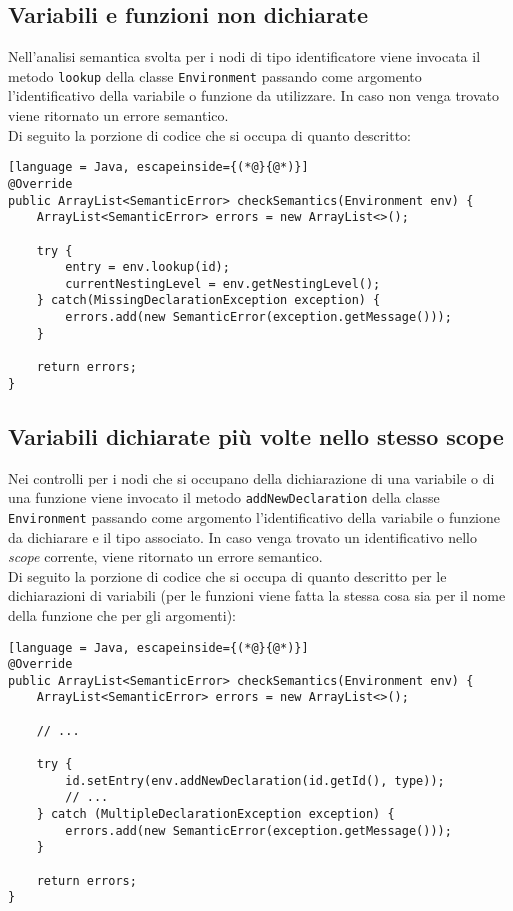 \documentclass[../report.tex]{subfiles}
\begin{document}
\subsection{Variabili e funzioni non dichiarate}\label{s:variabili-funzioni-non-dichiarate}
Nell'analisi semantica svolta per i nodi di tipo identificatore viene invocata il metodo \verb|lookup| della classe \verb|Environment| passando come argomento l'identificativo della variabile o funzione da utilizzare.
In caso non venga trovato viene ritornato un errore semantico.\\
\noindent
Di seguito la porzione di codice che si occupa di quanto descritto:
\begin{lstlisting}[language = Java, escapeinside={(*@}{@*)}]
@Override
public ArrayList<SemanticError> checkSemantics(Environment env) {
    ArrayList<SemanticError> errors = new ArrayList<>();

    try {
        entry = env.lookup(id);
        currentNestingLevel = env.getNestingLevel();
    } catch(MissingDeclarationException exception) {
        errors.add(new SemanticError(exception.getMessage()));
    }

    return errors;
}
\end{lstlisting}

\subsection{Variabili dichiarate più volte nello stesso scope}\label{s:variabili-dichiarate-piu-volte-stesso-scope}
Nei controlli per i nodi che si occupano della dichiarazione di una variabile o di una funzione viene invocato il metodo \verb|addNewDeclaration| della classe \verb|Environment| passando come argomento l'identificativo della variabile o funzione da dichiarare e il tipo associato.
In caso venga trovato un identificativo nello \textit{scope} corrente, viene ritornato un errore semantico.\\
\noindent
Di seguito la porzione di codice che si occupa di quanto descritto per le dichiarazioni di variabili (per le funzioni viene fatta la stessa cosa sia per il nome della funzione che per gli argomenti):
\begin{lstlisting}[language = Java, escapeinside={(*@}{@*)}]
@Override
public ArrayList<SemanticError> checkSemantics(Environment env) {
    ArrayList<SemanticError> errors = new ArrayList<>();
    
    // ...

    try {
        id.setEntry(env.addNewDeclaration(id.getId(), type));
        // ...
    } catch (MultipleDeclarationException exception) {
        errors.add(new SemanticError(exception.getMessage()));
    }

    return errors;
}
\end{lstlisting}
\end{document}
